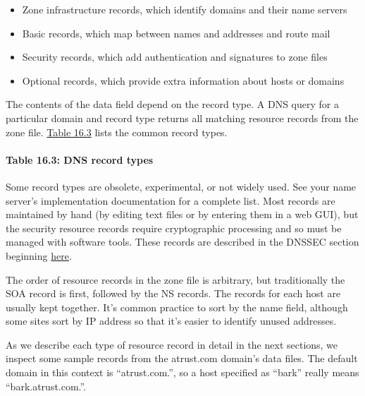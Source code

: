 \begin{itemize}
\item
  Zone infrastructure records, which identify domains and their name
  servers
\item
  Basic records, which map between names and addresses and route mail
\item
  Security records, which add authentication and signatures to zone
  files
\item
  Optional records, which provide extra information about hosts or
  domains
\end{itemize}

The contents of the {data} field depend on the record type. A DNS query
for a particular domain and record type returns all matching resource
records from the zone file.
\protect\hyperlink{part0024_split_021.htmlux5cux23_idTextAnchor872}{Table
16.3} lists the common record types.

\paragraph[{Table 16.3: }DNS record types]{\texorpdfstring{{Table 16.3:
}\protect\hypertarget{part0024_split_021.htmlux5cux23_idIndexMarker2066}{}{}\protect\hypertarget{part0024_split_021.htmlux5cux23_idIndexMarker2067}{}{}\protect\hypertarget{part0024_split_021.htmlux5cux23_idTextAnchor872}{}{}DNS
record types}{Table 16.3: DNS record types}}


Some record types are obsolete, experimental, or not widely used. See
your name server's implementation documentation for a complete list.
Most records are maintained by hand (by editing text files or by
entering them in a web GUI), but the security resource records require
cryptographic processing and so must be managed with software tools.
These records are described in the DNSSEC section beginning
\protect\hyperlink{part0024_split_059.htmlux5cux23_idTextAnchor938}{here}.

The order of resource records in the zone file is arbitrary, but
traditionally the SOA record is first, followed by the NS records. The
records for each host are usually kept together. It's common practice to
sort by the {name} field, although some sites sort by IP address so that
it's easier to identify unused addresses.

As we describe each type of resource record in detail in the next
sections, we inspect some sample records from the atrust.com domain's
data files. The default domain in this context is ``atrust.com.'', so a
host specified as ``bark'' really means ``bark.atrust.com.''.

